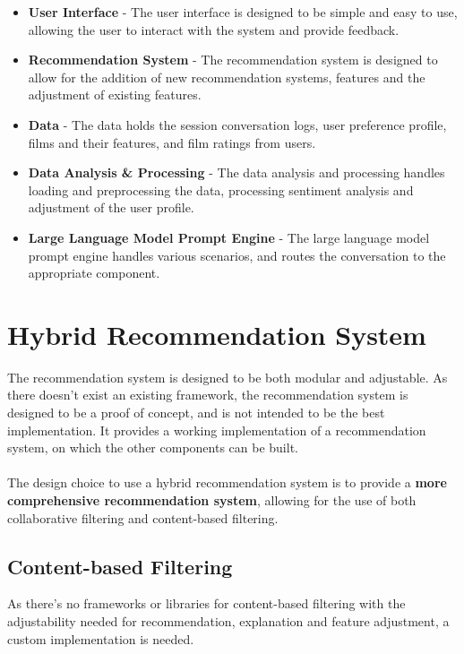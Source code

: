 \begin{itemize}
    \item \textbf{User Interface} - The user interface is designed to be simple and easy to use, allowing the user to interact with the system and provide feedback.
    \item \textbf{Recommendation System} - The recommendation system is designed to allow for the addition of new recommendation systems, features and the adjustment of existing features.
    \item \textbf{Data} - The data holds the session conversation logs, user preference profile, films and their features, and film ratings from users.
    \item \textbf{Data Analysis \& Processing} - The data analysis and processing handles loading and preprocessing the data, processing sentiment analysis and adjustment of the user profile.
    \item \textbf{Large Language Model Prompt Engine} - The large language model prompt engine handles various scenarios, and routes the conversation to the appropriate component.
\end{itemize}

\section{Hybrid Recommendation System}
\label{sec:recommendation_system_design}
The recommendation system is designed to be both modular and adjustable. 
As there doesn't exist an existing framework, the recommendation system is designed to be a proof of concept, and is not intended to be the best implementation.
It provides a working implementation of a recommendation system, on which the other components can be built.
\\\\
The design choice to use a hybrid recommendation system is to provide a \textbf{more comprehensive recommendation system}, allowing for the use of both collaborative filtering and content-based filtering.

\subsection{Content-based Filtering}
\label{sec:content_based_filtering_design}
As there's no frameworks or libraries for content-based filtering with the adjustability needed for recommendation, explanation and feature adjustment, a custom implementation is needed.

